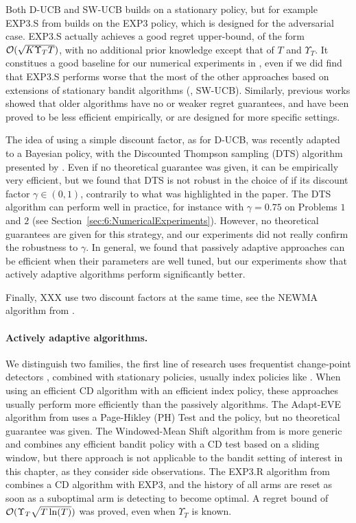 Both D-UCB and SW-UCB builds on a stationary policy, but for example EXP3.S from \cite{Auer02NonStochastic}
builds on the EXP3 policy, which is designed for the adversarial case.
EXP3.S actually achieves a good regret upper-bound, of the form $\mathcal{O}(\sqrt{K \Upsilon_T T})$, with no additional prior knowledge except that of $T$ and $\Upsilon_T$.
It constitues a good baseline for our numerical experiments in ,
even if we did find that EXP3.S performs worse that the most of the other approaches based on extensions of stationary bandit algorithms (\eg, SW-UCB).
Similarly, previous works showed that older algorithms have no or weaker regret guarantees, and have been proved to be less efficient empirically, or are designed for more specific settings.


The idea of using a simple discount factor, as for D-UCB, was recently adapted to a Bayesian policy, with the Discounted Thompson sampling (DTS) algorithm presented by \cite{RajKalyani17}.
Even if no theoretical guarantee was given, it can be empirically very efficient, but we found that DTS is not robust in the choice of if its discount factor $\gamma\in(0,1)$, contrarily to what was highlighted in the paper.
The DTS algorithm can perform well in practice, for instance with $\gamma=0.75$ on Problems $1$ and $2$ (see Section~\ref{sec:6:NumericalExperiments}). However, no theoretical guarantees are given for this strategy, and our experiments did not really confirm the robustness to $\gamma$.
%
In general, we found that passively adaptive approaches can be efficient when their parameters are well tuned, but our experiments show that actively adaptive algorithms perform significantly better.

Finally, XXX use two discount factors at the same time, see the NEWMA algorithm from \cite{Keriven2018}.



\paragraph{Actively adaptive algorithms.}
%
We distinguish two families,
the first line of research uses frequentist change-point detectors \cite{Basseville93}, combined with stationary policies, usually index policies like \UCB.
When using an efficient CD algorithm with an efficient index policy, these approaches usually perform more efficiently than the passively algorithms.
%
The Adapt-EVE algorithm from \cite{Hartland06} uses a Page-Hikley (PH) Test and the \UCB{} policy, but no theoretical guarantee was given.
%
The Windowed-Mean Shift algorithm from \cite{YuMannor09} is more generic and combines any efficient bandit policy with a CD test based on a sliding window, but there approach is not applicable to the bandit setting of interest in this chapter, as they consider side observations.
%
The EXP3.R algorithm from \cite{Allesiardo15,Allesiardo17} combines a CD algorithm with EXP3, and the history of all arms are reset as soon as a suboptimal arm is detecting to become optimal.
A regret bound of $\mathcal{O}(\Upsilon_T \sqrt{T \ln(T)})$ was proved, even when $\Upsilon_T$ is known.

